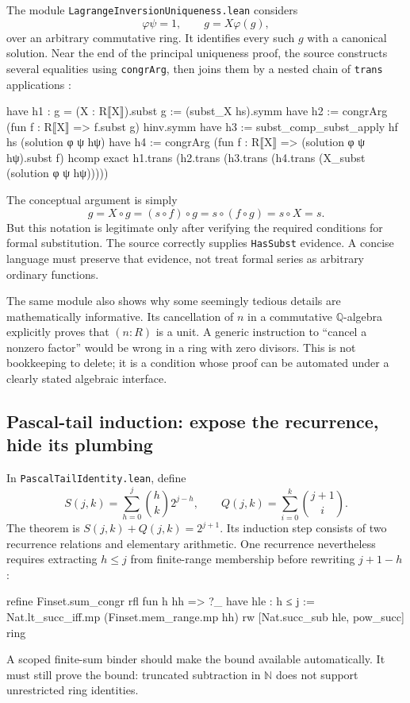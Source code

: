 \documentclass[11pt,a4paper]{article}
\newcommand{\NN}{\mathbb N}
\newcommand{\QQ}{\mathbb Q}
\newcommand{\codeid}[1]{\nolinkurl{#1}}
\begin{document}
The module \codeid{LagrangeInversionUniqueness.lean} considers
\[
 \varphi\psi=1,\qquad g=X\varphi(g),
\]
over an arbitrary commutative ring. It identifies every such $g$ with a canonical solution. Near the end of the principal uniqueness proof, the source constructs several equalities using \codeid{congrArg}, then joins them by a nested chain of \codeid{trans} applications \cite{srcseries}:
\par\noindent\begin{minipage}{\linewidth}
\begin{rawcode}
have h1 : g = (X : R⟦X⟧).subst g := (subst_X hs).symm
have h2 := congrArg (fun f : R⟦X⟧ => f.subst g) hinv.symm
have h3 := subst_comp_subst_apply hf hs (solution φ ψ hψ)
have h4 := congrArg
  (fun f : R⟦X⟧ => (solution φ ψ hψ).subst f) hcomp
exact h1.trans (h2.trans (h3.trans
  (h4.trans (X_subst (solution φ ψ hψ)))))
\end{rawcode}
\end{minipage}\par
The conceptual argument is simply
\[
 g=X\circ g=(s\circ f)\circ g
   =s\circ(f\circ g)=s\circ X=s.
\]
But this notation is legitimate only after verifying the required conditions for formal substitution. The source correctly supplies \codeid{HasSubst} evidence. A concise language must preserve that evidence, not treat formal series as arbitrary ordinary functions.

The same module also shows why some seemingly tedious details are mathematically informative. Its cancellation of $n$ in a commutative $\QQ$-algebra explicitly proves that $(n:R)$ is a unit. A generic instruction to ``cancel a nonzero factor'' would be wrong in a ring with zero divisors. This is not bookkeeping to delete; it is a condition whose proof can be automated under a clearly stated algebraic interface.

\subsection{Pascal-tail induction: expose the recurrence, hide its plumbing}

In \codeid{PascalTailIdentity.lean}, define
\[
 S(j,k)=\sum_{h=0}^{j}\binom hk2^{j-h},\qquad
 Q(j,k)=\sum_{i=0}^{k}\binom{j+1}{i}.
\]
The theorem is $S(j,k)+Q(j,k)=2^{j+1}$. Its induction step consists of two recurrence relations and elementary arithmetic. One recurrence nevertheless requires extracting $h\leq j$ from finite-range membership before rewriting $j+1-h$ \cite{srcpascal}:
\par\noindent\begin{minipage}{\linewidth}
\begin{rawcode}
refine Finset.sum_congr rfl fun h hh => ?_
have hle : h ≤ j := Nat.lt_succ_iff.mp (Finset.mem_range.mp hh)
rw [Nat.succ_sub hle, pow_succ]
ring
\end{rawcode}
\end{minipage}\par
A scoped finite-sum binder should make the bound available automatically. It must still prove the bound: truncated subtraction in $\NN$ does not support unrestricted ring identities.
\end{document}
